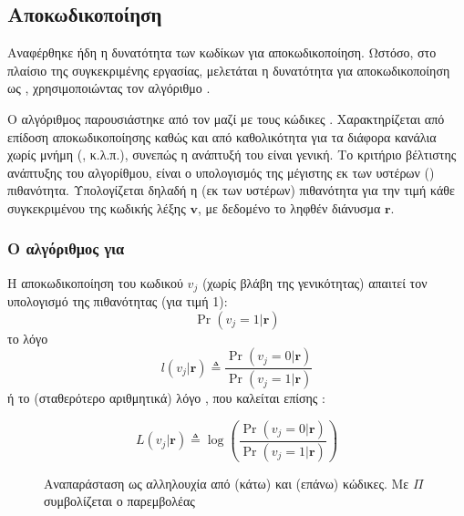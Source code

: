 \subsection{Αποκωδικοποίηση }

Αναφέρθηκε ήδη η δυνατότητα των  κωδίκων για  αποκωδικοποίηση. Ωστόσο, στο πλαίσιο της συγκεκριμένης εργασίας, μελετάται η δυνατότητα για αποκωδικοποίηση ως , χρησιμοποιώντας τον αλγόριθμο .

Ο αλγόριθμος παρουσιάστηκε από τον  μαζί με τους κώδικες . Χαρακτηρίζεται από  επίδοση αποκωδικοποίησης καθώς και από καθολικότητα για τα διάφορα κανάλια χωρίς μνήμη (, κ.λ.π.), συνεπώς η ανάπτυξή του είναι γενική. Το κριτήριο βέλτιστης ανάπτυξης του αλγορίθμου, είναι ο υπολογισμός της μέγιστης εκ των υστέρων () πιθανότητα. Υπολογίζεται δηλαδή η (εκ των υστέρων) πιθανότητα για την τιμή κάθε συγκεκριμένου  της κωδικής λέξης $\mathbf{v}$, με δεδομένο το ληφθέν διάνυσμα $\mathbf{r}$.

\subsubsection{Ο  αλγόριθμος για }

Η αποκωδικοποίηση του κωδικού  $v_j$ (χωρίς βλάβη της γενικότητας) απαιτεί τον υπολογισμό της  πιθανότητας (για τιμή  1):
\begin{equation*}
\Pr(v_j=1|\mathbf{r})
\end{equation*}
το λόγο 
\begin{equation*}
l(v_j|\mathbf{r})\triangleq\frac{\Pr(v_j=0|\mathbf{r})}{\Pr(v_j=1|\mathbf{r})}
\end{equation*}
ή το (σταθερότερο αριθμητικά) λόγο , που καλείται επίσης :

\begin{equation}
L(v_j|\mathbf{r})\triangleq\log\left(\frac{\Pr(v_j=0|\mathbf{r})}{\Pr(v_j=1|\mathbf{r})}\right)
\label{eq:LLR}
\end{equation}

\begin{figure}[h]
\caption{Αναπαράσταση  ως αλληλουχία από  (κάτω) και  (επάνω) κώδικες. Με $\Pi$ συμβολίζεται ο παρεμβολέας}
\label{fig:LDPC graphical}
\end{figure}

